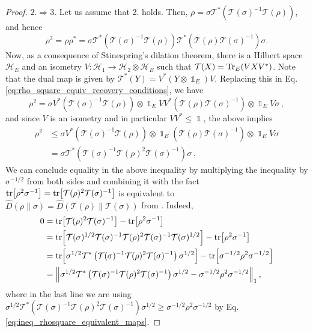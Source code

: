 \documentclass[11pt]{article}
\theoremstyle{newdefinition}
\theoremstyle{newplain}
\theoremstyle{myplain}
\DeclareMathOperator{\1}{\mathds{1}}
\begin{document}
{\begin{proof}
\noindent \underline{$2. \Rightarrow 3. $} 
  Let us assume that 2. holds. Then,   $ \rho = \sigma \mathcal{T}^\ast ( \mathcal{T}(\sigma)^{-1} \mathcal{T}(\rho) ) $, 
    and hence
    \begin{equation}\label{eq:rho_square_equiv_recovery_conditions}
        \rho^2 = \rho \rho^* = \sigma \mathcal{T}^\ast ( \mathcal{T}(\sigma)^{-1} \mathcal{T}(\rho) ) \mathcal{T}^\ast ( \mathcal{T}(\rho) \mathcal{T}(\sigma)^{-1}  )\sigma. 
    \end{equation}
    Now, as a consequence of Stinespring's dilation theorem, there is a Hilbert space $\mathcal{H}_E$ and an isometry $V:\mathcal{H}_1\to\mathcal{H}_2\otimes\mathcal{H}_E$ such that 
    $\mathcal{T}(X) = \Tr_E(VXV^*)$. Note that the dual map is given by $ \mathcal{T}^\ast(Y) = V^* (Y\otimes\1_E) V$. Replacing this in Eq. \eqref{eq:rho_square_equiv_recovery_conditions}, we have 
    \begin{equation}
        \rho^2 = \sigma V^*(\mathcal{T}(\sigma)^{-1} \mathcal{T}(\rho)) \otimes \1_E V V^* (\mathcal{T}(\rho) \mathcal{T}(\sigma)^{-1}) \otimes \1_E V \sigma \, ,
    \end{equation}
    and since $V$ is an isometry and in particular $VV^* \le \1$, the above implies
    \begin{align}\label{eq:ineq_rhosquare_equivalent_maps}
        \rho^2 &\le \sigma V^*(\mathcal{T}(\sigma)^{-1} \mathcal{T}(\rho)) \otimes \1_E  (\mathcal{T}(\rho) \mathcal{T}(\sigma)^{-1}) \otimes \1_E V \sigma  \\
        &= \sigma \mathcal{T}^\ast\left(\mathcal{T}(\sigma)^{-1} \mathcal{T}(\rho)^2 \mathcal{T}(\sigma)^{-1}\right) \sigma \, . 
    \end{align}
    We can conclude equality in the above inequality by multiplying the inequality by $\sigma^{-1/2}$ from both sides and combining it with the fact $\tr[\rho^2 \sigma^{-1}] = \tr[\mathcal{T}(\rho)^2 \mathcal{T}(\sigma)^{-1}]$ is equivalent to $\widehat{D}(\rho \| \sigma) = \widehat{D}(\mathcal{T}(\rho) \| \mathcal{T}(\sigma) ) $ from \cite[Theorem 3.34]{HiaiMosonyi-f-divergences-2017}. Indeed,
    \begin{align}
        0 &= \tr[\mathcal{T}(\rho)^2 \mathcal{T}(\sigma)^{-1}] - \tr[\rho^2 \sigma^{-1}] \\
        &= \tr[\mathcal{T}(\sigma)^{1/2} \mathcal{T}(\sigma)^{-1} \mathcal{T}(\rho)^2 \mathcal{T}(\sigma)^{-1} \mathcal{T}(\sigma)^{1/2}] - \tr[\rho^2 \sigma^{-1}]\\
        &= \tr[\sigma^{1/2}  \mathcal{T}^\ast\left(\mathcal{T}(\sigma)^{-1} \mathcal{T}(\rho)^2 \mathcal{T}(\sigma)^{-1}\right) \sigma^{1/2}] - \tr[\sigma^{-1/2} \rho^2 \sigma^{-1/2}]\\
        &= \norm{\sigma^{1/2}  \mathcal{T}^\ast\left(\mathcal{T}(\sigma)^{-1} \mathcal{T}(\rho)^2 \mathcal{T}(\sigma)^{-1}\right) \sigma^{1/2} - \sigma^{-1/2} \rho^2 \sigma^{-1/2}}_1 \, , 
    \end{align}
    where in the last line we are using  $\sigma^{1/2} \mathcal{T}^\ast\left(\mathcal{T}(\sigma)^{-1} \mathcal{T}(\rho)^2 \mathcal{T}(\sigma)^{-1}\right) \sigma^{1/2}  \geq \sigma^{-1/2} \rho^2 \sigma^{-1/2}$ by Eq. \eqref{eq:ineq_rhosquare_equivalent_maps}. 
    

\end{proof}}
\end{document}
